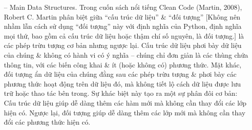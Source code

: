\documentclass{article}
\begin{document}
\begin{itemize}
\begin{itemize}
        -- {\sf Main Data Structures.} Trong cuốn sách nổi tiếng Clean Code (Martin, 2008), {\sc Robert C. Martin} phân biệt giữa ``cấu trúc dữ liệu'' \& ``đối tượng'' [Không nên nhầm lẫn cách sử dụng ``đối tượng'' này với định nghĩa của Python, định nghĩa mọi thứ, bao gồm cả cấu trúc dữ liệu hoặc thậm chí số nguyên, là đối tượng.] là các phép trừu tượng cơ bản nhưng ngược lại. Cấu trúc dữ liệu phơi bày dữ liệu của chúng \& không có hành vi có ý nghĩa -- chúng chỉ đơn giản là các thùng chứa thông tin, với các biến công khai \& ít (hoặc không có) phương thức. Mặt khác, đối tượng ẩn dữ liệu của chúng đằng sau các phép trừu tượng \& phơi bày các phương thức hoạt động trên dữ liệu đó, mà không tiết lộ cách dữ liệu được lưu trữ hoặc thao tác bên trong. Sự khác biệt này tạo ra một sự phân đôi cơ bản: Cấu trúc dữ liệu giúp dễ dàng thêm các hàm mới mà không cần thay đổi các lớp hiện có. Ngược lại, đối tượng giúp dễ dàng thêm các lớp mới mà không cần thay đổi các phương thức hiện có.


\end{itemize}
\end{itemize}
\end{document}
